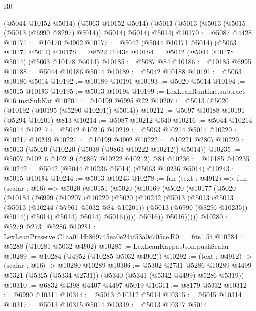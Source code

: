 \begin{lexlean}{R0}
\begin{coremodule}
    (@5044 @10152 @5014)
    (@5063 @10152 @5014)
    (@5013 (@5013 (@5013 (@5015 (@5013 (@6990 @8297) @5014)) @5014) @5014) @5014)
@10170 := @5087 @4428
@10171 := @10170 @4902
@10177 := @5042 (@5044 @10171 @5014) (@5063 @10171 @5014)
@10178 := @8522 @4438
@10184 := @5042 (@5044 @10178 @5014) (@5063 @10178 @5014)
@10185 := @5087 @84
@10186 := @10185 @6995
@10188 := @5044 @10186 @5014
@10189 := @5042 @10188
@10191 := @5063 @10186 @5014
@10192 := @10189 @10191
@10193 := @5020 @5014
@10194 := @5015 @10193
@10195 := @5013 @10194
@10199 := LexLeanRuntime.subtract @16 instSubNat
@10201 := @10199 @6995 @22
@10207 := @5013 (@5020 (@10192 (@10195 (@5290 @10201)) @5014))
@10212 := @5097 @10188 @10191 (@5294 @10201) @813
@10214 := @5087 @10212 @640
@10216 := @5044 @10214 @5014
@10217 := @5042 @10216
@10219 := @5063 @10214 @5014
@10220 := @10217 @10219
@10221 := @10199 @4902
@10222 := @10221 @2807
@10229 := @5013 (@5020 (@10220 (@5038 (@9863 @10222 @10212)) @5014))
@10235 := @5097 @10216 @10219 (@9867 @10222 @10212) @84
@10236 := @10185 @10235
@10242 := @5042 (@5044 @10236 @5014) (@5063 @10236 @5014)
@10243 := @5015 @10194
@10244 := @5013 @10243
@10278 := fun (text : @4912) =>
  fun (scalar : @16) =>
  @5020
    (@10151
      (@5020
        (@10169
          (@5020
            (@10177
              (@5020
                (@10184
                  (@6999
                    (@10207
                      (@10229
                        (@5020
                          (@10242
                            (@5013
                              (@5013
                                (@5013
                                  (@5013
                                    (@10244 (@7961 @5032 @84 @10201))
                                    (@5013 (@6990 (@8296 @10235)) @5014))
                                  @5014)
                                @5014)
                              @5014)
                            @5016)))))
                  @5016))
              @5016)))))
@10280 := @5279 @2731 @5286
@10281 := LexLeanPreserve.C1aa011fb869745ea0e24af53a0c705ce.R0.__fits_54
@10284 := @5288 (@10281 @5032 @4902)
@10285 := LexLeanKappa.Json.pushScalar
@10289 := @10284 (@4952 (@10285 @5032 @4902))
@10292 := (text : @4912) -> (scalar : @16) -> @10280 @10289
@10306 := @5302
    @2731
    @5286
    @10289
    @4499
    @5321
    (@5325 (@5334 @2731))
    (@5340 (@5341 (@5342 @4499) @5286 @5319))
@10310 := @6832 @4398 @4407 @4497 @5019
@10311 := @8179 @5032
@10312 := @6990 @10311
@10314 := @5013 @10312 @5014
@10315 := @5015 @10314
@10317 := @5013 @10315 @5014
@10319 := @5013 @10317 @5014

\end{coremodule}
\end{lexlean}
